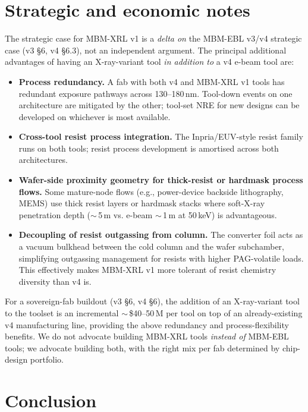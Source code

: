 \documentclass[11pt,letterpaper]{article}
\begin{document}
\section{Strategic and economic notes}

The strategic case for MBM-XRL v1 is a \textit{delta on} the MBM-EBL v3/v4 strategic case (v3 \S 6, v4 \S 6.3), not an independent argument. The principal additional advantages of having an X-ray-variant tool \textit{in addition to} a v4 e-beam tool are:

\begin{itemize}[leftmargin=1.6em]
  \item \textbf{Process redundancy.} A fab with both v4 and MBM-XRL v1 tools has redundant exposure pathways across 130--180\,nm. Tool-down events on one architecture are mitigated by the other; tool-set NRE for new designs can be developed on whichever is most available.
  \item \textbf{Cross-tool resist process integration.} The Inpria/EUV-style resist family runs on both tools; resist process development is amortised across both architectures.
  \item \textbf{Wafer-side proximity geometry for thick-resist or hardmask process flows.} Some mature-node flows (e.g., power-device backside lithography, MEMS) use thick resist layers or hardmask stacks where soft-X-ray penetration depth ($\sim$\,5\,\textmu m vs. e-beam $\sim$\,1\,\textmu m at 50\,keV) is advantageous.
  \item \textbf{Decoupling of resist outgassing from column.} The converter foil acts as a vacuum bulkhead between the cold column and the wafer subchamber, simplifying outgassing management for resists with higher PAG-volatile loads. This effectively makes MBM-XRL v1 more tolerant of resist chemistry diversity than v4 is.
\end{itemize}

For a sovereign-fab buildout (v3 \S 6, v4 \S 6), the addition of an X-ray-variant tool to the toolset is an incremental $\sim$\,\$40--50\,M per tool on top of an already-existing v4 manufacturing line, providing the above redundancy and process-flexibility benefits. We do not advocate building MBM-XRL tools \textit{instead of} MBM-EBL tools; we advocate building both, with the right mix per fab determined by chip-design portfolio.

\section{Conclusion}
\end{document}

